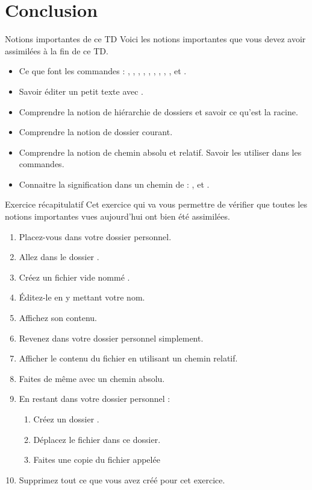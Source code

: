 \documentclass[a4paper,11pt]{style-esi/td}
\begin{document}
\section{Conclusion}

	\begin{theorie}{Notions importantes de ce TD}
		Voici les notions importantes que vous devez avoir assimilées à la fin de ce TD.
		\begin{itemize}
		\item 
			Ce que font les commandes : 
			, , , ,
			, , , 
			, ,  et .
		\item 
			Savoir éditer un petit texte avec .
		\item 
			Comprendre la notion de hiérarchie de dossiers 
			et savoir ce qu'est la racine.
		\item 
			Comprendre la notion de dossier courant.
		\item 
			Comprendre la notion de chemin absolu et relatif.
			Savoir les utiliser dans les commandes.
		\item 
			Connaitre la signification dans un chemin de : 
			\og{}\samp{\textasciitilde}\fg{},
			\og{}\fg{} et \og{}\fg{}.
		\end{itemize}
	\end{theorie}

	\begin{Exercice}{Exercice récapitulatif}
		Cet exercice qui va vous permettre de vérifier
		que toutes les notions importantes vues aujourd'hui
		ont bien été assimilées.
		\begin{enumerate}
			\item Placez-vous dans votre dossier personnel.
			\item Allez dans le dossier .
			\item Créez un fichier vide nommé .
			\item Éditez-le en y mettant votre nom.
			\item Affichez son contenu.
			\item Revenez dans votre dossier personnel simplement.
			\item Afficher le contenu du fichier 
				en utilisant un chemin relatif.
			\item Faites de même avec un chemin absolu.
			\item En restant dans votre dossier personnel :
			\begin{enumerate}
				\item Créez un dossier .
				\item Déplacez le fichier  dans ce dossier.
				\item Faites une copie du fichier 
					appelée 
			\end{enumerate}
			\item Supprimez tout ce que vous avez créé pour cet exercice.
		\end{enumerate}
	\end{Exercice}
\end{document}
